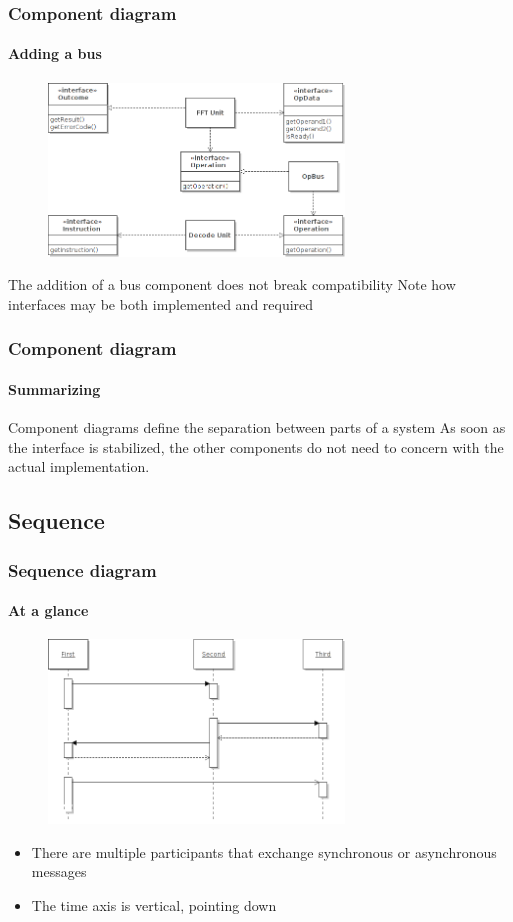 \begin{frame}
\frametitle{Component diagram}
\framesubtitle{Adding a bus}

\begin{figure}
\includegraphics[width=0.7\textwidth]{lecture02/img/connected_components_bus.png}
\end{figure}

\begin{block}{The addition of a bus component does not break compatibility}
Note how interfaces may be both implemented and required
\end{block}
\end{frame}

\begin{frame}
\frametitle{Component diagram}
\framesubtitle{Summarizing}

\begin{block}{Component diagrams define the separation between parts of a system}
As soon as the interface is stabilized, the other components do not need to concern with the actual implementation.
\end{block}
\end{frame}

\subsection{Sequence}

\begin{frame}
\frametitle{Sequence diagram}
\framesubtitle{At a glance}

\begin{figure}
\includegraphics[width=0.7\textwidth]{lecture02/img/abstract_sequence.png}
\end{figure}

\begin{itemize}
\item There are multiple participants that exchange synchronous or asynchronous messages
\item The time axis is vertical, pointing down
\end{itemize}
\end{frame}


